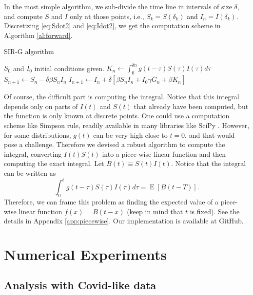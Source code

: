 \documentclass[USenglish,10pt]{article}
\newcommand{\Gb}{\overline{G}\xspace}
\DeclareMathOperator{\Exp}{E}       %
\newcommand{\E}[1]{\Exp\left[{#1}\right]}       %
\begin{document}
In the most simple algorithm, we sub-divide the time line in intervals of size $\delta$, and compute $S$ and $I$ only at those points, i.e., $S_k=S(\delta_k)$ and $I_n=I(\delta_k)$. Discretizing \eqref{eq:Sdot2} and \eqref{eq:Idot2}, we get the computation scheme in Algorithm \ref{al:forward}.

\begin{algorithm}[ht]
    \caption{SIR-G algorithm}
    \label{al:simple}
    \begin{algorithmic}[1] %
		\State	$S_0$ and $I_0$  initial conditions given.
			\State $K_n \gets \int_0^{\delta n} g(t-\tau) S(\tau)I(\tau)d\tau$
			\State $S_{n+1} \gets  S_n - \delta\beta S_n I_n$
			\State $I_{n+1} \gets  I_n + \delta\left[\beta S_n I_n + I_0\gamma\Gb_n + \beta K_n\right]$
		\EndFor
    \end{algorithmic}
    \label{al:forward}
\end{algorithm}


Of course, the difficult part is computing the integral. Notice that this integral depends only on parts of $I(t)$ and $S(t)$ that already have been computed, but the function is only known at discrete points.
One could use a computation scheme like Simpson rule, readily available in many libraries like SciPy \cite{jon.ea.01}. However, for some distributions, $g(t)$ can be very high close to $t=0$, and that would pose a challenge. Therefore we devised a robust algorithm to compute the integral, converting $I(t)S(t)$ into a piece wise linear function and then computing the exact integral. Let $B(t)\equiv S(t)I(t)$. Notice that the integral can be written as
\[ \int_0^{t} g(t-\tau) S(\tau)I(\tau)d\tau = \E{B(t-T)}.  \]
Therefore, we can frame this problem as finding the expected value of a piece-wise linear function $f(x)=B(t-x)$ (keep in mind that $t$ is fixed). See the details in Appendix \ref{app:piecewise}. Our implementation is available at GitHub\cite{rian20}.

\section{Numerical Experiments}\label{sc:numerical}

\subsection{Analysis with Covid-like data}
\end{document}

